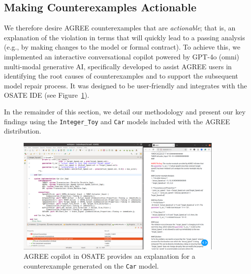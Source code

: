 \subsection{Making Counterexamples Actionable} 
We therefore desire AGREE counterexamples that are \textit{actionable}; that is, an explanation of the violation in terms that will quickly lead to a passing analysis (e.g., by making changes to the model or formal contract).
%
To achieve this, we implemented
an interactive conversational copilot powered by GPT-4o (omni) multi-modal generative AI, specifically developed to assist AGREE users in identifying the root causes of counterexamples and to support the subsequent model repair process. It was designed to be user-friendly and integrates with the OSATE IDE (see Figure~\ref{fig:AGREEDOG}). 

In the remainder of this section, we detail our methodology and present our key findings using the \texttt{Integer\_Toy} and \texttt{Car} models included with the AGREE distribution.

\begin{figure}[htbp]  
    \centering
    \includegraphics[width=0.9\textwidth]{AGREE-DOG-high-rs.png}%
    \caption{AGREE copilot in OSATE provides an explanation for a counterexample generated on the \texttt{Car} model.}
    \label{fig:AGREEDOG}
\end{figure}


